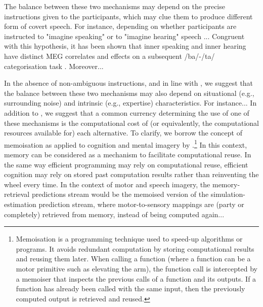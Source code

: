 \documentclass[utf8]{template/frontiersSCNS} %
\begin{document}
The balance between these two mechanisms may depend on the precise instructions given to the participants, which may clue them to produce different form of covert speech. For instance, depending on whether participants are instructed to "imagine speaking" or to "imagine hearing" speech \citep[see also the distinction between the "inner ear" and the "inner voice", e.g.,][]{smith_subvocalization_1992}... Congruent with this hypothesis, it has been shown that inner speaking and inner hearing have distinct MEG correlates and effects on a subsequent /ba/-/ta/ categorisation task \citep{ma_distinct_2019}. Moreover...

In the absence of non-ambiguous instructions, and in line with \cite{tian_mental_2012}, we suggest that the balance between these two mechanisms may also depend on situational (e.g., surrounding noise) and intrinsic (e.g., expertise) characteristics. For instance... In addition to \cite{tian_mental_2012}, we suggest that a common currency determining the use of one of these mechanisms is the computational cost of (or equivalently, the computational resources available for) each alternative. To clarify, we borrow the concept of memoisation as applied to cognition and mental imagery by \cite{dasgupta_memory_2021}.\footnote{Memoisation is a programming technique used to speed-up algorithms or programs. It avoids redundant computation by storing computational results and reusing them later. When calling a function (where a function can be a motor primitive such as elevating the arm), the function call is intercepted by a memoiser that inspects the previous calls of a function and its outputs. If a function has already been called with the same input, then the previously computed output is retrieved and reused.} In this context, memory can be considered as a mechanism to facilitate computational reuse. In the same way efficient programming may rely on computational reuse, efficient cognition may rely on stored past computation results rather than reinventing the wheel every time. In the context of motor and speech imagery, the memory-retrieval predictions stream would be the memoised version of the simulation-estimation prediction stream, where motor-to-sensory mappings are (party or completely) retrieved from memory, instead of being computed again...
\end{document}

